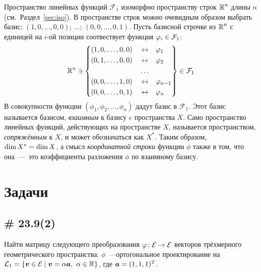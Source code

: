 \documentclass[a4paper,12pt]{article}
\begin{document}
  Пространство линейных функций $\mathcal F_1$ изоморфно пространству строк $\operatorname{\mathbb R}^n$ длины $n$ (см.~Раздел~\ref{sec:iso}).
  В пространстве строк можно очевидным образом выбрать базис: $(1, 0, \ldots, 0, 0)$; ...; $(0, 0, \ldots, 0, 1)$.
  Пусть базисной строчке из $\operatorname{\mathbb R}^n$ с единицей на $i$-ой позиции соотвествует функция $\phi_i \hm\in \mathcal F_1$:
  \[
    \RR^n \ni \left\{
      \begin{aligned}
        &(1, 0, \ldots, 0, 0)            & &\leftrightarrow & &\phi_{1\hphantom{-1}}\\
        &(0, 1, \ldots, 0, 0)            & &\leftrightarrow & &\phi_{2\hphantom{-1}}\\
        &\hphantom{(0, 1, \ldots, 0, 0)} & &\ldots  & &\hphantom{\phi_{2\hphantom{-1}}}\\
        &(0, 0, \ldots, 1, 0)            & &\leftrightarrow & &\phi_{n-1}\\
        &(0, 0, \ldots, 0, 1)            & &\leftrightarrow & &\phi_{n\hphantom{-1}}
      \end{aligned}
    \right\} \in \mathcal F_1
  \]
  В совокупности функции $(\phi_1, \phi_2, \ldots, \phi_n)$ дадут базис в $\mathcal F_1$.
  Этот базис называется базисом, \emph{взаимным} к базису $e$ пространства $X$.
  Само пространство линейных функций, действующих на пространстве $X$, называется пространством, \emph{сопряжённым} к $X$, и может обозначаться как $X^{*}$.
  Таким образом, $\dim X^{*} \hm= \dim X$, а смысл \emph{координатной строки} функции $\phi$ также в том, что она~---~это коэффициенты разложения $\phi$ по взаимному базису.
  
  
  
  \section{Задачи}
  
  
  \subsection{\# 23.9(2)}
  
  Найти матрицу следующего преобразования $\phi \colon \mathcal E \hm\to \mathcal E$ векторов трёхмерного геометрического пространства:
  $\phi$~---ортогональное проектирование на $\mathcal L_1 \hm= \{\bds v \hm\in \mathcal E \hm\mid \bds v \hm= \alpha \bds a,\ \alpha \hm\in \RR\}$, где $\bds a \hm= (1, 1, 1)^T$.
  
\end{document}
